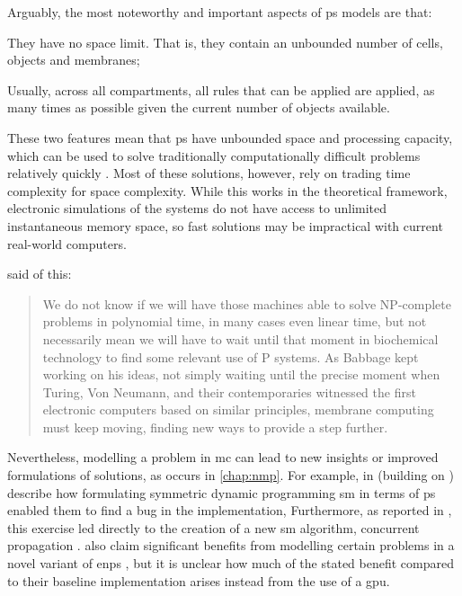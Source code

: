 Arguably, the most noteworthy and important aspects of \gls{ps} models are that:
\begin{inparaenum}[(i)]
\item They have no space limit.  That is, they contain an unbounded number of cells, objects and membranes;
\item Usually, across all \glspl{compartment}, all rules that can be applied are applied, as many times as possible given the current number of objects available.
\end{inparaenum}
These two features mean that \gls{ps} have unbounded space and processing capacity, which can be used to solve traditionally computationally difficult problems relatively quickly \cite{Sosik2003,Jimenez2003,Paun1999a,Henderson2020}.  Most of these solutions, however, rely on trading time complexity for space complexity.  While this works in the theoretical framework, electronic simulations of the systems do not have access to unlimited instantaneous memory space, so fast solutions may be impractical with current real-world computers.

\citeauthor{Valencia-Cabrera2019} said of this:
\blockcquote[][p.~213]{Valencia-Cabrera2019}{We do not know if we will have those machines able to solve NP-complete problems in polynomial time, in many cases even linear time, but  not necessarily mean we will have to wait until that moment in biochemical technology to find some relevant use of P systems. As Babbage kept working on his ideas, not simply waiting until the precise moment when Turing, Von Neumann, and their contemporaries witnessed the first electronic computers based on similar principles, membrane computing must keep moving, finding new ways to provide a step further.}

Nevertheless, modelling a problem in \gls{mc} can lead to new insights or improved formulations of solutions, as occurs in \cref{chap:nmp}.  For example, in \cite{GimelFarb2013a} (building on \cite{Gimelfarb2011}) \citeauthor{GimelFarb2013a} describe how formulating symmetric dynamic programming \gls{sm} in terms of \gls{ps} enabled them to find a bug in the implementation,   Furthermore, as reported in \cite{Nicolescu2014b}, this exercise led directly to the creation of a new \gls{sm} algorithm, concurrent propagation \cite{Gimelfarb2012}.  \citeauthor{Pang2018} \cite{Pang2018} also claim significant benefits from modelling certain problems in a novel variant of \gls{enps} \cite{Pavel2010}, but it is unclear how much of the stated benefit compared to their baseline implementation arises instead from the use of a \gls{gpu}.

